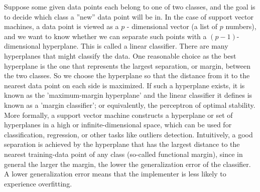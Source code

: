 Suppose some given data points each belong to one of two classes, and the goal is to decide which class a ''new'' data point will be in. In the case of support vector machines, a data point is viewed as a \(p\) - dimensional vector (a list of \(p\) numbers), and we want to know whether we can separate such points with a \((p-1)\)-dimensional hyperplane. This is called a linear classifier. There are many hyperplanes that might classify the data. One reasonable choice as the best hyperplane is the one that represents the largest separation, or margin, between the two classes. So we choose the hyperplane so that the distance from it to the nearest data point on each side is maximized. If such a hyperplane exists, it is known as the 'maximum-margin hyperplane' and the linear classifier it defines is known as a 'margin classifier'; or equivalently, the perceptron of optimal stability.
\\

More formally, a support vector machine constructs a hyperplane or set of hyperplanes in a high or infinite-dimensional space, which can be used for classification, regression, or other tasks like outliers detection. Intuitively, a good separation is achieved by the hyperplane that has the largest distance to the nearest training-data point of any class (so-called functional margin), since in general the larger the margin, the lower the generalization error of the classifier. A lower generalization error means that the implementer is less likely to experience overfitting.
\\

